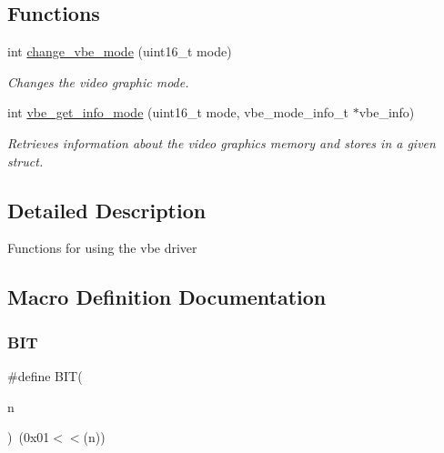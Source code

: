 \subsection*{Functions}
\begin{DoxyCompactItemize}
\item 
int \mbox{\hyperlink{group__vbe_ga3ed45ade635fef064bfe8c181df1a08f}{change\+\_\+vbe\+\_\+mode}} (uint16\+\_\+t mode)
\begin{DoxyCompactList}\small\item\em Changes the video graphic mode. \end{DoxyCompactList}\item 
int \mbox{\hyperlink{group__vbe_ga384e6657ec15cb7f19a2d15b0337b72a}{vbe\+\_\+get\+\_\+info\+\_\+mode}} (uint16\+\_\+t mode, vbe\+\_\+mode\+\_\+info\+\_\+t $\ast$vbe\+\_\+info)
\begin{DoxyCompactList}\small\item\em Retrieves information about the video graphics memory and stores in a given struct. \end{DoxyCompactList}\end{DoxyCompactItemize}


\subsection{Detailed Description}
Functions for using the vbe driver 

\subsection{Macro Definition Documentation}
\mbox{\label{group__vbe_ga3a8ea58898cb58fc96013383d39f482c}} 
\subsubsection{\texorpdfstring{B\+IT}{BIT}}
{\footnotesize\ttfamily \#define B\+IT(\begin{DoxyParamCaption}\item[{}]{n }\end{DoxyParamCaption})~(0x01$<$$<$(n))}

\mbox{\label{group__vbe_gac80fb38edf3a38ac5322ff07dcf8d892}} 
